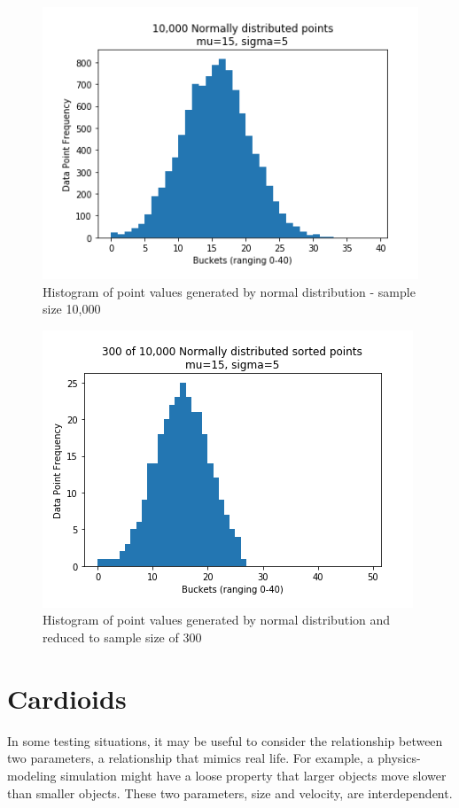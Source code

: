 \begin{figure}[h!]
\centering
\includegraphics[scale=0.7]{law2.png}
\caption{Histogram of point values generated by normal distribution - sample size 10,000}
\label{fig:law2}
\end{figure}

\begin{figure}[h!]
\centering
\includegraphics[scale=0.7]{law3.png}
\caption{Histogram of point values generated by normal distribution and reduced to sample size of 300}
\label{fig:law3}
\end{figure}


\section{Cardioids}

In some testing situations, it may be useful to consider the relationship between two parameters, a relationship that mimics real life. For example, a physics-modeling simulation might have a loose property that larger objects move slower than smaller objects. These two parameters, size and velocity, are interdependent.

